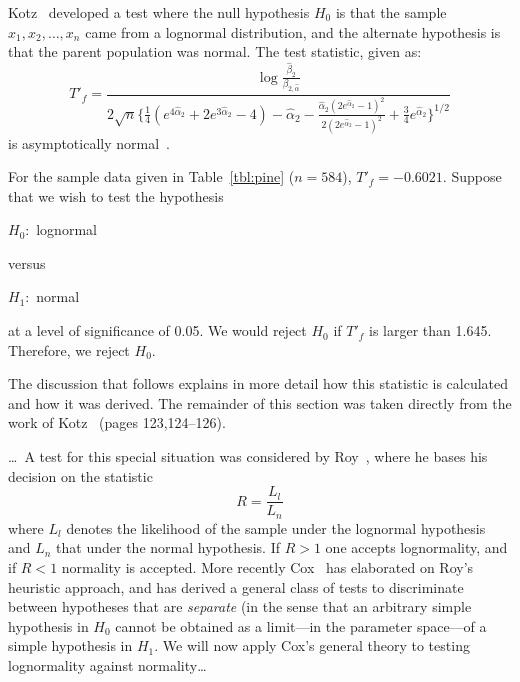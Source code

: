 \documentclass[draft]{article}
\newenvironment{example}{%
   \vspace{\baselineskip}
   \par\noindent\hrulefill\par
   \noindent{\em Example:}}{%
   \par\noindent\hrulefill\par
   \vspace{\baselineskip}}
\begin{document}
Kotz~\cite{kotz73} developed a test where the null hypothesis
\(H_0\) is that the sample \(x_1, x_2, \ldots, x_n\) came
from a lognormal distribution, and the alternate hypothesis
is that the parent population was normal. The test statistic,
given as:
\begin{equation}
T'_f = \frac{\log\frac{\hat{\beta}_2}{\beta_{2,\hat{\alpha}}}}
{2\sqrt{n}\{\frac{1}{4}\left(e^{4\hat{\alpha}_2}+
2e^{3\hat{\alpha}_2} -4\right) -\hat{\alpha}_2 -
\frac{\hat{\alpha}_2\left(2e^{\hat{\alpha}_2}-1\right)^2}
     {2\left(2e^{\hat{\alpha}_2}-1\right)^2}
+\frac{3}{4}e^{\hat{\alpha}_2}\}^{1/2}}
\end{equation}
is asymptotically normal~\cite{cox62}.

\begin{example}
For the sample data given in Table~\ref{tbl:pine} (\(n=584\)),
\(T'_f = -0.6021\).  Suppose that we wish to test the hypothesis

\(H_0:\) lognormal

\noindent versus

\(H_1:\) normal

\noindent at a level of significance of 0.05. We would
reject \(H_0\) if \(T'_f\) is larger
than 1.645.  Therefore, we reject \(H_0\).
\end{example}

The discussion that follows explains in more detail how this
statistic is calculated and how it was derived. The remainder
of this section
was taken directly from the work of Kotz~\cite{kotz73}
(pages 123,124--126).

\ldots\ A test for this special situation was considered
by Roy~\cite{roy50}, where he bases his decision on the
statistic
\begin{equation}
R=\frac{L_l}{L_n}
\end{equation}
where \(L_l\) denotes the likelihood of the sample under the
lognormal hypothesis and \(L_n\) that under the normal
hypothesis. If \(R>1\) one accepts lognormality,
and if \(R<1\) normality is accepted. More recently Cox~\cite{cox61,cox62}
has elaborated on Roy's heuristic approach, and has derived a general
class of tests to discriminate between hypotheses that are {\em separate\/}
(in the sense that an arbitrary simple hypothesis in \(H_0\) cannot
be obtained as a limit---in the parameter space---of a simple hypothesis
in \(H_1\). We will now apply Cox's general theory to testing
lognormality against normality\ldots
\end{document}
